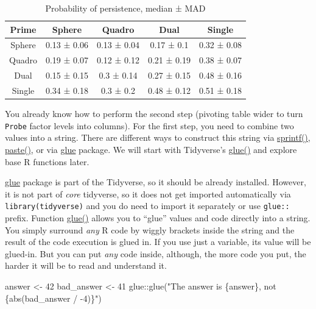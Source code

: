 \documentclass[
]{book}
\newenvironment{Shaded}{\begin{snugshade}}{\end{snugshade}}
\newcommand{\DecValTok}[1]{\textcolor[rgb]{0.00,0.00,0.81}{#1}}
\newcommand{\FunctionTok}[1]{\textcolor[rgb]{0.00,0.00,0.00}{#1}}
\newcommand{\NormalTok}[1]{#1}
\newcommand{\OtherTok}[1]{\textcolor[rgb]{0.56,0.35,0.01}{#1}}
\newcommand{\SpecialCharTok}[1]{\textcolor[rgb]{0.00,0.00,0.00}{#1}}
\newcommand{\StringTok}[1]{\textcolor[rgb]{0.31,0.60,0.02}{#1}}
\begin{document}
\begin{table}

\caption{\label{tab:unnamed-chunk-294}Probability of persistence, median ± MAD}
\centering
\begin{tabular}[t]{c|c|c|c|c}
\hline
Prime & Sphere & Quadro & Dual & Single\\
\hline
Sphere & 0.13 ± 0.06 & 0.13 ± 0.04 & 0.17 ± 0.1 & 0.32 ± 0.08\\
\hline
Quadro & 0.19 ± 0.07 & 0.12 ± 0.12 & 0.21 ± 0.19 & 0.38 ± 0.07\\
\hline
Dual & 0.15 ± 0.15 & 0.3 ± 0.14 & 0.27 ± 0.15 & 0.48 ± 0.16\\
\hline
Single & 0.34 ± 0.18 & 0.3 ± 0.2 & 0.48 ± 0.12 & 0.51 ± 0.18\\
\hline
\end{tabular}
\end{table}

You already know how to perform the second step (pivoting table wider to turn \texttt{Probe} factor levels into columns). For the first step, you need to combine two values into a string. There are different ways to construct this string via \href{https://stat.ethz.ch/R-manual/R-devel/library/base/html/sprintf.html}{sprintf()}, \href{https://stat.ethz.ch/R-manual/R-devel/library/base/html/paste.html}{paste()}, or via \href{https://glue.tidyverse.org/}{glue} package. We will start with Tidyverse's \href{https://glue.tidyverse.org/reference/glue.html}{glue()} and explore base R functions later.

\href{https://glue.tidyverse.org/}{glue} package is part of the Tidyverse, so it should be already installed. However, it is not part of \emph{core} tidyverse, so it does not get imported automatically via \texttt{library(tidyverse)} and you do need to import it separately or use \texttt{glue::} prefix. Function \href{https://glue.tidyverse.org/reference/glue.html}{glue()} allows you to ``glue'' values and code directly into a string. You simply surround \emph{any} R code by wiggly brackets inside the string and the result of the code execution is glued in. If you use just a variable, its value will be glued-in. But you can put \emph{any} code inside, although, the more code you put, the harder it will be to read and understand it.

\begin{Shaded}
\begin{Highlighting}[]
\NormalTok{answer }\OtherTok{\textless{}{-}} \DecValTok{42}
\NormalTok{bad\_answer }\OtherTok{\textless{}{-}} \DecValTok{41}
\NormalTok{glue}\SpecialCharTok{::}\FunctionTok{glue}\NormalTok{(}\StringTok{"The answer is \{answer\}, not \{abs(bad\_answer / {-}4)\}"}\NormalTok{)}
\end{Highlighting}
\end{Shaded}
\end{document}
